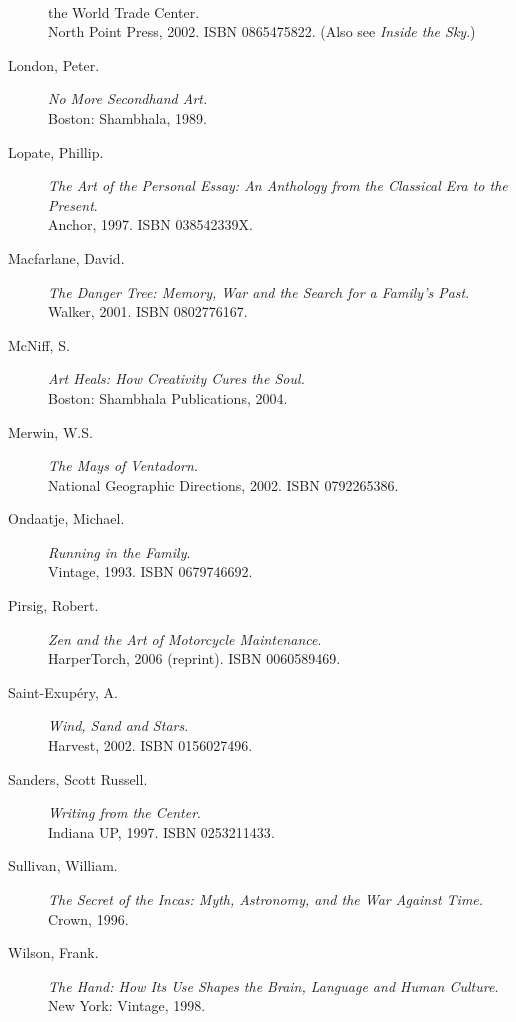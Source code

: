 \documentclass[10pt,DIV09,letterpaper,oneside,headsepline]{scrreprt}
\begin{document}
\begin{description}
{\\the World Trade Center}. \\North Point Press, 2002.
\textsc{ISBN 0865475822}. (Also see \textit{Inside the Sky}.)
\item [London, Peter.] \textit{No More Secondhand Art.} 
\\Boston: Shambhala, 1989.
\item [Lopate, Phillip.] \textit{The Art of the Personal Essay: An
Anthology from the Classical Era to the Present}. \\Anchor, 1997.
\textsc{ISBN 038542339X}.
\item [Macfarlane, David.] \textit{The Danger Tree: Memory, War and
the Search for a Family's Past}. \\Walker, 2001. \textsc{ISBN
0802776167}.
\item[McNiff, S.] \textit{Art Heals: How Creativity Cures the Soul.} \\Boston: Shambhala Publications, 2004.
\item [Merwin, W.S.] \textit{The Mays of Ventadorn}. \\National
Geographic Directions, 2002. \textsc{ISBN 0792265386}.
\item [Ondaatje, Michael.] \textit{Running in the Family}. \\Vintage,
1993. \textsc{ISBN 0679746692}.
\item [Pirsig, Robert.] \textit{Zen and the Art of Motorcycle
Maintenance}. \\HarperTorch, 2006 (reprint). \textsc{ISBN
0060589469}.
\item [Saint-Exup\'ery, A.] \textit{Wind, Sand and Stars}. \\Harvest,
2002. \textsc{ISBN 0156027496}.
\item [Sanders, Scott Russell.] \textit{Writing from the Center}.
\\Indiana UP, 1997. \textsc{ISBN 0253211433}.
\item [Sullivan, William.] \textit{The Secret of the Incas: Myth,
Astronomy, and the War Against Time.} \\Crown, 1996.
\item[Wilson, Frank.] \textit{The Hand: How Its Use Shapes the Brain, Language and Human Culture.}
\\New York: Vintage, 1998.

\end{description}
\end{document}
